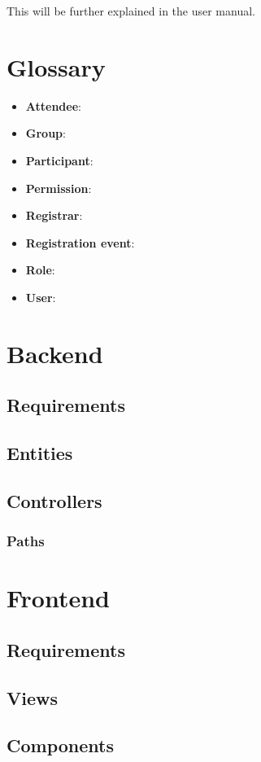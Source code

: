 \documentclass[12pt, letterpaper]{article}
\newcommand{\bolditem}[1]{\item \textbf{#1}}
\newcommand{\newpagesection}[1]{\newpage \section{#1}}
\begin{document}
This will be further explained in the user manual.

\newpagesection{Glossary}

\begin{itemize}
    \bolditem{Attendee}:
    \bolditem{Group}:
    \bolditem{Participant}:
    \bolditem{Permission}:
    \bolditem{Registrar}:
    \bolditem{Registration event}:
    \bolditem{Role}:
    \bolditem{User}:
\end{itemize}

\newpagesection{Backend}

\subsection{Requirements}

\subsection{Entities}

\subsection{Controllers}

\subsubsection{Paths}

\newpagesection{Frontend}

\subsection{Requirements}

\subsection{Views}

\subsection{Components}
\end{document}

